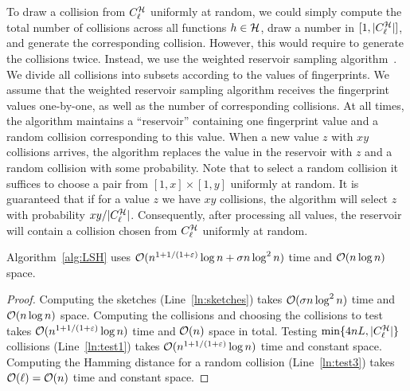 To draw a collision from $C^{\mathcal{H}}_{\ell}$ uniformly at random, we could simply compute the total number of collisions across all functions $h \in \mathcal{H}$, draw a number in $[1,  |C^{\mathcal{H}}_{\ell}|]$, and generate the corresponding collision. However, this would require to generate the collisions twice. Instead, we use the weighted reservoir sampling algorithm~\cite{reservoir}. We divide all collisions into subsets according to the values of fingerprints. We assume that the weighted reservoir sampling algorithm receives the fingerprint values one-by-one, as well as the number of corresponding collisions. At all times, the algorithm maintains a ``reservoir'' containing one fingerprint value and a random collision corresponding to this value. When a new value $z$ with $xy$ collisions arrives, the algorithm replaces the value in the reservoir with $z$ and a random collision with some probability. Note that to select a random collision it suffices to choose a pair from $[1,x] \times [1,y]$ uniformly at random. It is guaranteed that if for a value $z$ we have $xy$ collisions, the algorithm will select $z$ with probability $xy/|C^{\mathcal{H}}_{\ell}|$. Consequently, after processing all values, the reservoir will contain a collision chosen from $C^{\mathcal{H}}_{\ell}$ uniformly at random.

\begin{lemma}\label{lm:complexity}
Algorithm~\ref{alg:LSH} uses $\mathcal{O}(n^{1+1/(1+\varepsilon)} \log n + \sigma n \log^2 n)$ time and $\mathcal{O}(n \log n)$ space. 
\end{lemma}
\begin{proof}
Computing the sketches (Line~\ref{ln:sketches}) takes $\mathcal{O}(\sigma n \log^2 n)$ time and $\mathcal{O}(n \log n)$ space. Computing the collisions and choosing the collisions to test takes $\mathcal{O}(n^{1+1/(1+\varepsilon)} \log n)$ time and $\mathcal{O}(n)$ space in total. Testing $\min \{4nL, |C^{\mathcal{H}}_{\ell}|\}$ collisions (Line~\ref{ln:test1}) takes $\mathcal{O}(n^{1+1/(1+\varepsilon)} \log n)$ time and constant space. Computing the Hamming distance for a random collision (Line~\ref{ln:test3}) takes $\mathcal{O}(\ell) = \mathcal{O}(n)$ time and constant space.
\end{proof}

